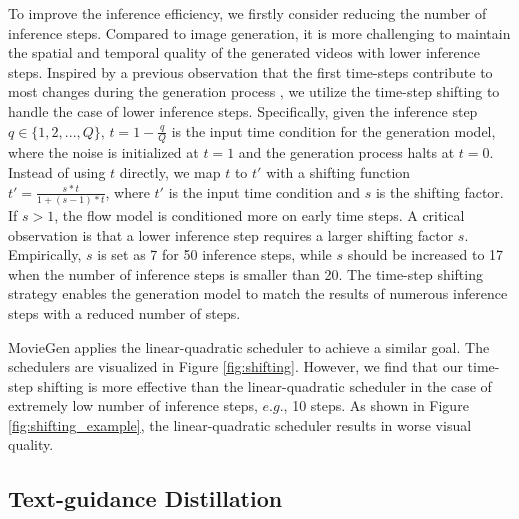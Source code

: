 To improve the inference efficiency, we firstly consider reducing the number of inference steps. Compared to image generation, it is more challenging to maintain the spatial and temporal quality of the generated videos with lower inference steps. Inspired by a previous observation that the first time-steps contribute to most changes during the generation process \cite{zhao2024real,polyak2024movie,zhang2022unsupervised,zhang2023shiftddpms}, we utilize the time-step shifting to handle the case of lower inference steps. Specifically, given the inference step $q \in \{1,2,...,Q\}$, $t=1-\frac{q}{Q}$ is the input time condition for the generation model, where the noise is initialized at $t=1$ and the generation process halts at $t=0$. Instead of using $t$ directly, we map $t$ to $t'$ with a shifting function $t'=\frac{s*t}{1+(s-1)*t}$, where $t'$ is the input time condition and $s$ is the shifting factor. If $s>1$, the flow model is conditioned more on early time steps. A critical observation is that a lower inference step requires a larger shifting factor $s$. Empirically, $s$ is set as 7 for 50 inference steps, while $s$ should be increased to 17 when the number of inference steps is smaller than 20. The time-step shifting strategy enables the generation model to match the results of numerous inference steps with a reduced number of steps.

MovieGen \cite{polyak2024movie} applies the linear-quadratic scheduler to achieve a similar goal. The schedulers are visualized in Figure \ref{fig:shifting}. However, we find that our time-step shifting is more effective than the linear-quadratic scheduler in the case of extremely low number of inference steps, $e.g.$, 10 steps. As shown in Figure \ref{fig:shifting_example}, the linear-quadratic scheduler results in worse visual quality. 
 

\subsection{Text-guidance Distillation}

